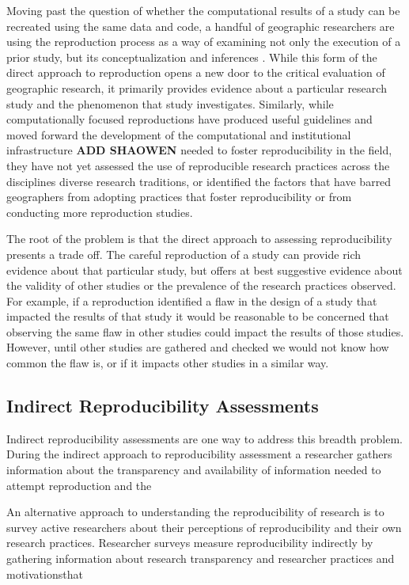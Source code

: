 \documentclass[]{interact}
\theoremstyle{plain}%
\theoremstyle{definition}
\theoremstyle{remark}
\begin{document}
Moving past the question of whether the computational results of a study can be recreated using the same data and code, a handful of geographic researchers are using the reproduction process as a way of examining not only the execution of a prior study, but its conceptualization and inferences \citep{Kedron_MollaloRP, Kedron_SaffaryRP, Kedron_VijayanRP}. 
While this form of the direct approach to reproduction opens a new door to the critical evaluation of geographic research, it primarily provides evidence about a particular research study and the phenomenon that study investigates. 
Similarly, while computationally focused reproductions have produced useful guidelines \citep{hofer2019reproducible, wilson2021} and moved forward the development of the computational and institutional infrastructure \citep{Kedron_Holler_Bardin_Hilgendorf_2022, nust2019, nust2021,}\textbf{ADD SHAOWEN} needed to foster reproducibility in the field, they have not yet assessed the use of reproducible research practices across the disciplines diverse research traditions, or identified the factors that have barred geographers from adopting practices that foster reproducibility or from conducting more reproduction studies. 

The root of the problem is that the direct approach to assessing reproducibility presents a trade off. 
The careful reproduction of a study can provide rich evidence about that particular study, but offers at best suggestive evidence about the validity of other studies or the prevalence of the research practices observed.
For example, if a reproduction identified a flaw in the design of a study that impacted the results of that study it would be reasonable to be concerned that observing the same flaw in other studies could impact the results of those studies.
However, until other studies are gathered and checked we would not know how common the flaw is, or if it impacts other studies in a similar way. 

\subsection*{Indirect Reproducibility Assessments}
Indirect reproducibility assessments are one way to address this breadth problem. 
During  the indirect approach to reproducibility assessment a researcher gathers information about the transparency and availability of information needed to attempt reproduction and the 

An alternative approach to understanding the reproducibility of research is to survey active researchers about their perceptions of reproducibility and their own research practices.
Researcher surveys measure reproducibility indirectly by gathering information about research transparency and researcher practices and motivationsthat 
\end{document}
